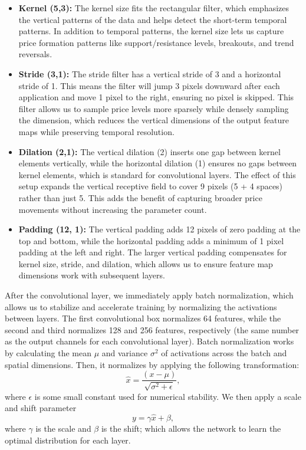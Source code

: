 \documentclass[12pt]{article}
\begin{document}
\begin{itemize}
	\item \textbf{Kernel (5,3):} The kernel size fits the rectangular filter, which emphasizes the vertical patterns of the data and helps detect the short-term temporal patterns. In addition to temporal patterns, the kernel size lets us capture price formation patterns like support/resistance levels, breakouts, and trend reversals.
	\item \textbf{Stride (3,1):} The stride filter has a vertical stride of 3 and a horizontal stride of 1. This means the filter will jump 3 pixels downward after each application and move 1 pixel to the right, ensuring no pixel is skipped. This filter allows us to sample price levels more sparsely while densely sampling the dimension, which reduces the vertical dimensions of the output feature maps while preserving temporal resolution.
	\item \textbf{Dilation (2,1):} The vertical dilation (2) inserts one gap between kernel elements vertically, while the horizontal dilation (1) ensures no gaps between kernel elements, which is standard for convolutional layers. The effect of this setup expands the vertical receptive field to cover 9 pixels (5 + 4 spaces) rather than just 5. This adds the benefit of capturing broader price movements without increasing the parameter count.
	\item \textbf{Padding (12, 1):} The vertical padding adds 12 pixels of zero padding at the top and bottom, while the horizontal padding adds a minimum of 1 pixel padding at the left and right. The larger vertical padding compensates for kernel size, stride, and dilation, which allows us to ensure feature map dimensions work with subsequent layers.
\end{itemize}
After the convolutional layer, we immediately apply batch normalization, which allows us to stabilize and accelerate training by normalizing the activations between layers. The first convolutional box normalizes 64 features, while the second and third normalizes 128 and 256 features, respectively (the same number as the output channels for each convolutional layer). Batch normalization works by calculating the mean $\mu$ and variance $\sigma^2$ of activations across the batch and spatial dimensions. Then, it normalizes by applying the following transformation:
\begin{equation}
	\hat{x}=\frac{(x-\mu)}{\sqrt{\sigma^2+\epsilon}},
\end{equation}
where $\epsilon$ is some small constant used for numerical stability. We then apply a scale and shift parameter
\begin{equation}
	y=\gamma\hat{x}+\beta,
\end{equation}
where $\gamma$ is the scale and $\beta$ is the shift; which allows the network to learn the optimal distribution for each layer.
\end{document}
